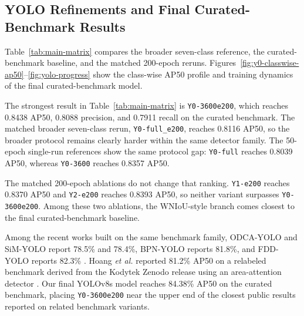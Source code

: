 \documentclass[journal,article,submit,moreauthors,pdftex]{Definitions/tsp}
\begin{document}
\subsection{YOLO Refinements and Final Curated-Benchmark Results}
\label{sec:main-results}

Table~\ref{tab:main-matrix} compares the broader seven-class reference, the curated-benchmark baseline, and the matched 200-epoch reruns. Figures~\ref{fig:y0-classwise-ap50}--\ref{fig:yolo-progress} show the class-wise AP50 profile and training dynamics of the final curated-benchmark model.

The strongest result in Table~\ref{tab:main-matrix} is \texttt{Y0-3600e200}, which reaches 0.8438 AP50, 0.8088 precision, and 0.7911 recall on the curated benchmark. The matched broader seven-class rerun, \texttt{Y0-full\_e200}, reaches 0.8116 AP50, so the broader protocol remains clearly harder within the same detector family. The 50-epoch single-run references show the same protocol gap: \texttt{Y0-full} reaches 0.8039 AP50, whereas \texttt{Y0-3600} reaches 0.8357 AP50.

The matched 200-epoch ablations do not change that ranking. \texttt{Y1-e200} reaches 0.8370 AP50 and \texttt{Y2-e200} reaches 0.8393 AP50, so neither variant surpasses \texttt{Y0-3600e200}. Among these two ablations, the WNIoU-style branch comes closest to the final curated-benchmark baseline.

Among the recent works built on the same benchmark family, ODCA-YOLO and SiM-YOLO report 78.5\% and 78.4\%, BPN-YOLO reports 81.8\%, and FDD-YOLO reports 82.3\% \citep{odca_yolo,bpn_yolo,sim_yolo,fdd_yolo}. Hoang \textit{et al.} reported 81.2\% AP50 on a relabeled benchmark derived from the Kodytek Zenodo release using an area-attention detector \citep{cmc_wood_area_attention}. Our final YOLOv8s model reaches 84.38\% AP50 on the curated benchmark, placing \texttt{Y0-3600e200} near the upper end of the closest public results reported on related benchmark variants.
\end{document}
